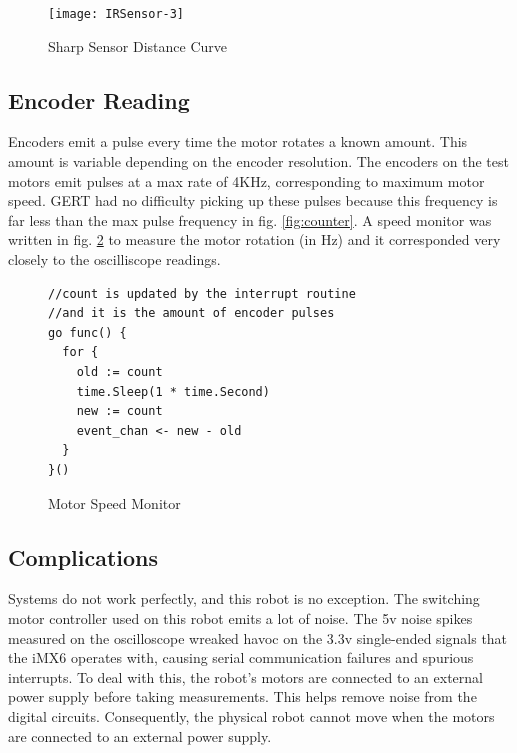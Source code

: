 \begin{figure}[h]
\begin{center}
  \texttt{[image: IRSensor-3]}
\end{center}
  \caption{Sharp Sensor Distance Curve} \label{fig:curve}
\end{figure}

\clearpage
\subsection{Encoder Reading}
Encoders emit a pulse every time the motor rotates a known amount. This amount is variable depending on the
encoder resolution. The encoders on the test motors emit pulses at a max rate of 4KHz, corresponding to
maximum motor speed. GERT had no difficulty picking up these pulses because this frequency is far less than
the max pulse frequency in fig. \ref{fig:counter}. A speed monitor was written in fig. \ref{fig:speedmon}
to measure the motor rotation (in Hz) and it corresponded very closely to the oscilliscope readings.

\begin{figure}[h]
\begin{center}
\begin{lstlisting}
//count is updated by the interrupt routine
//and it is the amount of encoder pulses
go func() {
  for {
    old := count
    time.Sleep(1 * time.Second)
    new := count
    event_chan <- new - old
  }
}()
\end{lstlisting}
\end{center}
  \caption{Motor Speed Monitor} \label{fig:speedmon}
\end{figure}

\subsection{Complications}
Systems do not work perfectly, and this robot is no exception. The switching motor controller used
on this robot emits a lot of noise. The 5v noise spikes measured on the oscilloscope wreaked havoc
on the 3.3v single-ended signals that the iMX6 operates with, causing serial communication failures
and spurious interrupts. To deal with this, the robot's motors are connected to an external power supply before
taking measurements. This helps remove noise from the digital circuits. Consequently, the physical
robot cannot move when the motors are connected to an external power supply.

